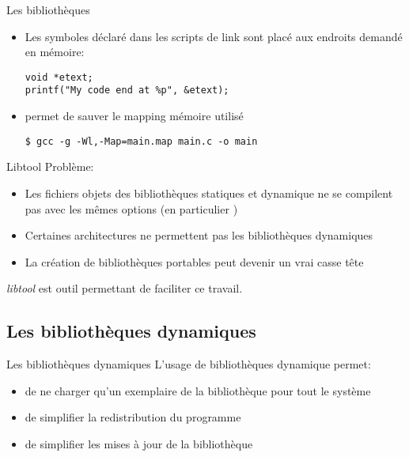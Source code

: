 \begin{frame}[fragile=singleslide]{Les bibliothèques}
  \begin{itemize}
  \item  Les  symboles déclaré dans les scripts
    de link sont placé aux endroits demandé en mémoire:
    \begin{lstlisting}
void *etext;
printf("My code end at %p", &etext);
    \end{lstlisting}
  \item {} permet de sauver le mapping mémoire utilisé
    \begin{lstlisting}
$ gcc -g -Wl,-Map=main.map main.c -o main
    \end{lstlisting}
  \end{itemize}
\end{frame}

\begin{frame}[fragile=singleslide]{Libtool}
  Problème:
  \begin{itemize}
  \item Les  fichiers objets des bibliothèques  statiques et dynamique
    ne  se  compilent  pas  avec  les mêmes  options  (en  particulier
    )
  \item  Certaines architectures ne  permettent pas  les bibliothèques
    dynamiques
  \item La  création de bibliothèques  portables peut devenir  un vrai
    casse tête
  \end{itemize}
  \emph{libtool} est outil permettant de faciliter ce travail.
\end{frame}

\subsection{Les bibliothèques dynamiques}

\begin{frame}[fragile=singleslide]{Les bibliothèques dynamiques}
  L'usage de bibliothèques dynamique permet:
  \begin{itemize}
  \item de ne charger qu'un exemplaire de la bibliothèque pour tout le
    système
  \item de simplifier la redistribution du programme
  \item de simplifier les mises à jour de la bibliothèque
  \end{itemize}
\end{frame}

